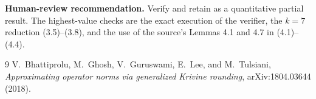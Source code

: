 \documentclass[11pt]{article}
\begin{document}
\noindent\textbf{Human-review recommendation.}
Verify and retain as a quantitative partial result.  The highest-value checks
are the exact execution of the verifier, the $k=7$ reduction
(3.5)--(3.8), and the use of the source's Lemmas 4.1 and 4.7 in (4.1)--(4.4).

\begin{thebibliography}{9}
V.~Bhattiprolu, M.~Ghosh, V.~Guruswami, E.~Lee, and M.~Tulsiani,
\emph{Approximating operator norms via generalized Krivine rounding},
arXiv:1804.03644 (2018).
\end{thebibliography}
\end{document}
